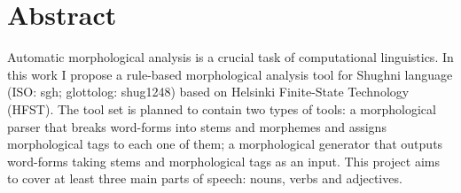 \section*{Abstract}

Automatic morphological analysis is a crucial task of computational linguistics. In this work I propose a rule-based morphological analysis tool for Shughni language (ISO: sgh; glottolog: shug1248) based on Helsinki Finite-State Technology (HFST). The tool set is planned to contain two types of tools: a morphological parser that breaks word-forms into stems and morphemes and assigns morphological tags to each one of them; a morphological generator that outputs word-forms taking stems and morphological tags as an input. This project aims to cover at least three main parts of speech: nouns, verbs and adjectives. 

\newpage